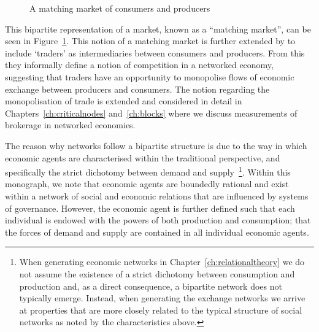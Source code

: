 \begin{figure}[t]
\label{fig:bipartiteexchange}
\begin{center}
\end{center}
\caption{A matching market of consumers and producers}
\end{figure}

This bipartite representation of a market, known as a ``matching market'', can be seen in Figure~\ref{fig:bipartiteexchange}. This notion of a matching market is further extended by \citet{EasleyKleinberg2010} to include `traders' as intermediaries between consumers and producers. From this they informally define a notion of competition in a networked economy, suggesting that traders have an opportunity to monopolise flows of economic exchange between producers and consumers. The notion regarding the monopolisation of trade is extended and considered in detail in Chapters~\ref{ch:criticalnodes} and~\ref{ch:blocks} where we discuss measurements of brokerage in networked economies.

The reason why networks follow a bipartite structure is due to the way in which economic agents are characterised within the traditional perspective, and specifically the strict dichotomy between demand and supply~\footnote{When generating economic networks in Chapter~\ref{ch:relationaltheory} we do not assume the existence of a strict dichotomy between consumption and production and, as a direct consequence, a bipartite network does not typically emerge. Instead, when generating the exchange networks we arrive at properties that are more closely related to the typical structure of social networks as noted by the characteristics above.}. Within this monograph, we note that economic agents are boundedly rational and exist within a network of social and economic relations that are influenced by systems of governance. However, the economic agent is further defined such that each individual is endowed with the powers of both production and consumption; that the forces of demand and supply are contained in all individual economic agents.

